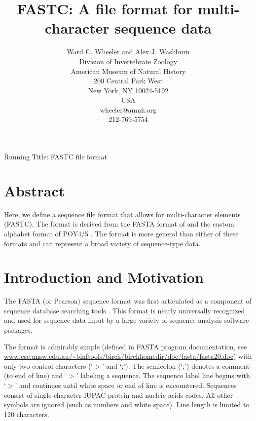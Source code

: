 \documentclass[12pt]{article}
\begin{document}
\title{FASTC: A file format for multi-character sequence data}
\author{Ward C. Wheeler and Alex J. Washburn \\
		Division of  Invertebrate Zoology\\
		American Museum of Natural History\\
		200 Central Park West\\
		New York, NY 10024-5192\\
		USA\\
		wheeler@amnh.org\\
		212-769-5754}

\maketitle
\begin{center}
Running Title: FASTC file format
\end{center}
\newpage
\doublespacing

\section{Abstract}
Here, we define a sequence file format that allows for multi-character elements (FASTC).  The format is derived from the FASTA format of \cite{LipmanandPearson1985} and the custom alphabet format of POY4/5 \citep{POY4,Wheeleretal2015}.  The format is more general than either of these formats and can represent a broad variety of sequence-type data.

\newpage
\tableofcontents
\newpage

\section{Introduction and Motivation}
The FASTA (or Pearson) sequence format was first articulated as a component of sequence database searching tools
\citep{LipmanandPearson1985}.  This format is nearly universally recognized and used for sequence data input 
by a large variety of sequence analysis software packages.

The format is admirably simple (defined in FASTA program documentation, see \url{www.cse.unsw.edu.au/~binftools/birch/birchhomedir/doc/fasta/fasta20.doc}) with 
only two control characters (`$>$' and `;').  The semicolon (`;') denotes a comment (to end of line) and `$>$' labeling a sequence.  
The sequence label line begins with `$>$' and continues until white space or end of line is encountered.  Sequences consist of single-character
IUPAC protein and nucleic acids codes.  All other symbols are ignored (such as numbers and white space).  Line length is limited to 120 characters.
\end{document}
